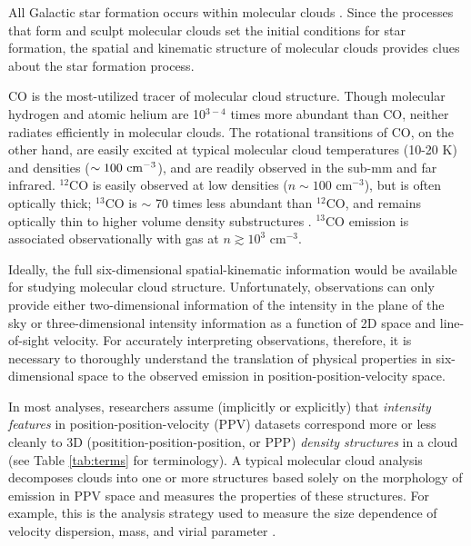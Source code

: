 All Galactic star formation occurs within molecular clouds \citep{mckee07}. Since the processes that
form and sculpt molecular clouds set the initial conditions for star
formation, the spatial and kinematic structure of molecular clouds provides clues
about the star formation process.

CO is the most-utilized tracer of molecular cloud structure. Though molecular hydrogen
and atomic helium are 10$^{3-4}$ times more abundant than CO, neither radiates
efficiently in molecular clouds. The rotational transitions of CO, on the other hand,
are easily excited at typical molecular cloud temperatures (10-20 K) and densities ($\sim100 ~{\rm cm}^{-3}$),
and are readily observed in the sub-mm and far infrared. $^{12}$CO is easily observed at low densities ($n \sim 100$ cm$^{-3}$), but is often optically thick; $^{13}$CO is $\sim$ 70 times less abundant than $^{12}$CO, and remains optically thin to higher volume density substructures \citep{http://adsabs.harvard.edu/abs/2010MNRAS.405..759D, http://adsabs.harvard.edu/abs/1999RPPh...62..143W, http://adsabs.harvard.edu/abs/1982ApJ...262..590F}. $^{13}$CO emission is associated observationally with gas at $n\gtrsim 10^3$ cm$^{-3}$.

Ideally, the full six-dimensional spatial-kinematic information would be available for studying molecular cloud structure.  Unfortunately, observations can only provide either two-dimensional information of the intensity in the plane of the sky or three-dimensional intensity information as a function of 2D space and line-of-sight velocity. For accurately interpreting observations, therefore, it is necessary to thoroughly understand the translation of physical properties in six-dimensional space to the observed emission in position-position-velocity space.

In most analyses, researchers assume (implicitly or explicitly) that \textit{intensity features} in position-position-velocity (PPV) datasets
correspond more or less cleanly to 3D (positition-position-position, or PPP) \textit{density structures} in a cloud (see Table \ref{tab:terms} for terminology). A typical molecular cloud analysis decomposes clouds into
one or more structures based solely on the morphology of emission in PPV space and measures the properties
of these structures. For example, this is the
analysis strategy used to measure the size dependence of velocity dispersion, mass, and virial parameter \citep{http://adsabs.harvard.edu/abs/1981MNRAS.194..809L, http://adsabs.harvard.edu/abs/1987ApJ...319..730S, http://adsabs.harvard.edu/abs/2008ApJ...686..948B}.

